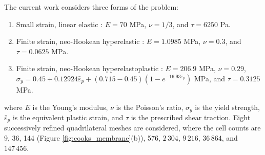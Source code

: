 \documentclass[sn-mathphys,Numbered]{sn-jnl}%
\begin{document}
The current work considers three forms of the problem:
\begin{enumerate}[label=\roman*.]
	\item Small strain, linear elastic \cite{Zienkiewicz2000, Simplas}: $E=70$ MPa, $\nu=1/3$, and $\tau = 6250$ Pa.
	\item Finite strain, neo-Hookean hyperelastic \cite{Pelteret2018}: $E=1.0985$ MPa, $\nu=0.3$, and $\tau = 0.0625$ MPa.
	\item Finite strain, neo-Hookean hyperelastoplastic \citep{Simo1992, Simplas, Cesar2001}: $E=206.9$ MPa, $\nu=0.29$, $\sigma_y = 0.45 + 0.12924\bar{\varepsilon}_p + (0.715 - 0.45)(1- e^{-16.93\bar{\varepsilon}_p})$ MPa, and $\tau = 0.3125$ MPa.
\end{enumerate}
where $E$ is the Young's modulus, $\nu$ is the Poisson's ratio, $\sigma_y$ is the yield strength, $\bar{\varepsilon}_p$ is the equivalent plastic strain, and $\tau$ is the prescribed shear traction.
Eight successively refined quadrilateral meshes are considered, where the cell counts are 9, 36, 144 (Figure \ref{fig:cooks_membrane}(b)), 576, $2\,304$, $9\,216$, $36\,864$, and $147\,456$.
\end{document}
